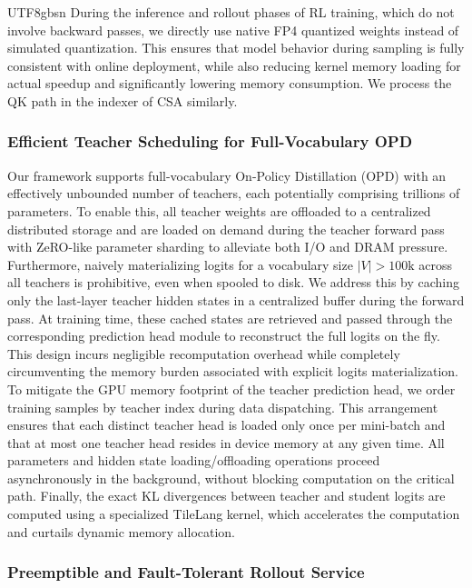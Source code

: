 \documentclass[11pt, a4paper, logo, copyright, nonumbering]{deepseek}
\newcommand{\csa}{CSA}
\begin{document}
\begin{CJK*}{UTF8}{gbsn}
During the inference and rollout phases of RL training, which do not involve backward passes, we directly use native FP4 quantized weights instead of simulated quantization. 
This ensures that model behavior during sampling is fully consistent with online deployment, while also reducing kernel memory loading for actual speedup and significantly lowering memory consumption.
We process the QK path in the indexer of \csa{} similarly.

\subsubsection{Efficient Teacher Scheduling for Full-Vocabulary OPD} 
Our framework supports full-vocabulary On-Policy Distillation (OPD) with an effectively unbounded number of teachers, each potentially comprising trillions of parameters. 
To enable this, all teacher weights are offloaded to a centralized distributed storage and are loaded on demand during the teacher forward pass with ZeRO-like parameter sharding to alleviate both I/O and DRAM pressure.
Furthermore, naively materializing logits for a vocabulary size $|V| > 100\text{k}$ across all teachers is prohibitive, even when spooled to disk.
We address this by caching only the last-layer teacher hidden states in a centralized buffer during the forward pass. 
At training time, these cached states are retrieved and passed through the corresponding prediction head module to reconstruct the full logits on the fly. 
This design incurs negligible recomputation overhead while completely circumventing the memory burden associated with explicit logits materialization. 
To mitigate the GPU memory footprint of the teacher prediction head, we order training samples by teacher index during data dispatching. 
This arrangement ensures that each distinct teacher head is loaded only once per mini-batch and that at most one teacher head resides in device memory at any given time. 
All parameters and hidden state loading/offloading operations proceed asynchronously in the background, without blocking computation on the critical path. 
Finally, the exact KL divergences between teacher and student logits are computed using a specialized TileLang kernel, which accelerates the computation and curtails dynamic memory allocation.

\subsubsection{Preemptible and Fault-Tolerant Rollout Service}
\label{subsec:inference-stream-caching}


\end{CJK*}
\end{document}

